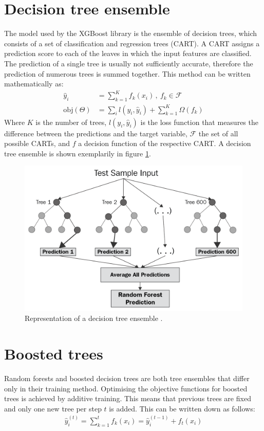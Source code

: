 \section{Decision tree ensemble}
The model used by the XGBoost library is the ensemble of decision trees, which consists of a set of classification and regression trees (CART).
A CART assigns a prediction score to each of the leaves in which the input features are classified. The prediction of a single tree is usually not sufficiently accurate,
therefore the prediction of numerous trees is summed together. This method can be written mathematically as:
\begin{align}
  \hat{y}_i &= \sum_{k=1}^K f_k(x_i)\,, \: f_k \in \mathcal{F} \\
  \text{obj}(\Theta) &= \sum_i l(y_i, \hat{y}_i) + \sum_{k=1}^K \Omega(f_k)
\end{align}
Where $K$ is the number of trees, $l(y_i, \hat{y}_i)$ is the loss function that measures the difference between the predictions and the
target variable, $\mathcal{F}$ the set of all possible CARTs, and $f$ a decision function of the respective CART. A decision tree ensemble is shown exemplarily in
figure \ref{fig:random_forest}.

\begin{figure}
  \centering
  \includegraphics[height=0.6\textwidth]{images/random_forest.png}
  \caption{Representation of a decision tree ensemble \cite{random_forest}.}
  \label{fig:random_forest}
\end{figure}

\section{Boosted trees}
Random forests and boosted decision trees are both tree ensembles that differ only in their training method.
Optimising the objective functions for
boosted trees is achieved by additive training. This means that previous trees are fixed and only one new tree per step $t$ is added. This can be written
down as follows:
\begin{align}
  \hat{y}_i^{(t)} = \sum_{k=1}^t f_k(x_i) = \hat{y}_i^{(t-1)} + f_t(x_i)
\end{align}

